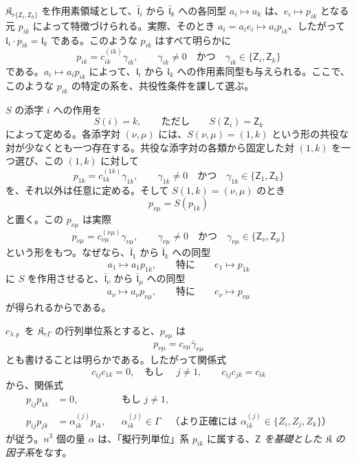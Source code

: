\(\mathfrak K_{r\{\mathsf{Z}_i,\mathsf{Z}_k\}}\) を作用素領域として、\(\bar{\mathfrak l}_i\) から \(\bar{\mathfrak l}_k\) への各同型 \(a_i\mapsto a_k\) は、\(e_i\mapsto p_{ik}\) となる元 \(p_{ik}\) によって特徴づけられる。実際、そのとき \(a_i=a_ie_i\mapsto a_ip_{ik}\)、したがって \(\mathfrak l_i\cdot p_{ik}=\mathfrak l_k\) である。このような \(p_{ik}\) はすべて明らかに
\[
p_{ik}=c_{ik}^{(ik)}\gamma_{ik},\qquad
\gamma_{ik}\ne0\quad\text{かつ}\quad \gamma_{ik}\in\{\mathsf{Z}_i,\mathsf{Z}_k\}
\]
である。\(a_i\mapsto a_ip_{ik}\) によって、\(\mathfrak l_i\) から \(\mathfrak l_k\) への作用素同型も与えられる。ここで、このような \(p_{ik}\) の特定の系を、共役性条件を課して選ぶ。

\(S\) の添字 \(i\) への作用を
\[
S(i)=k,\qquad\text{ただし}\qquad S(\mathsf{Z}_i)=\mathsf{Z}_k
\]
によって定める。各添字対 \((\nu,\mu)\) には、\(S(\nu,\mu)=(1,k)\) という形の共役な対が少なくとも一つ存在する。共役な添字対の各類から固定した対 \((1,k)\) を一つ選び、この \((1,k)\) に対して
\[
p_{1k}=c_{1k}^{(1k)}\gamma_{1k},\qquad
\gamma_{1k}\ne0\quad\text{かつ}\quad \gamma_{1k}\in\{\mathsf{Z}_1,\mathsf{Z}_k\}
\]
を、それ以外は任意に定める。そして \(S(1,k)=(\nu,\mu)\) のとき
\[
p_{\nu\mu}=S(p_{1k})
\]
と置く。この \(p_{\nu\mu}\) は実際
\[
p_{\nu\mu}=c_{\nu\mu}^{(\nu\mu)}\gamma_{\nu\mu},\qquad
\gamma_{\nu\mu}\ne0\quad\text{かつ}\quad \gamma_{\nu\mu}\in\{\mathsf{Z}_\nu,\mathsf{Z}_\mu\}
\]
という形をもつ。なぜなら、\(\bar{\mathfrak l}_1\) から \(\bar{\mathfrak l}_k\) への同型
\[
a_1\mapsto a_1p_{1k},\qquad
\text{特に}\qquad e_1\mapsto p_{1k}
\]
に \(S\) を作用させると、\(\bar{\mathfrak l}_\nu\) から \(\bar{\mathfrak l}_\mu\) への同型
\[
a_\nu\mapsto a_\nu p_{\nu\mu},\qquad
\text{特に}\qquad e_\nu\mapsto p_{\nu\mu}
\]
が得られるからである。

\(c_{\lambda\varrho}\) を \(\mathfrak K_{r\Gamma}\) の行列単位系とすると、\(p_{\nu\mu}\) は
\[
p_{\nu\mu}=c_{\nu\mu}\bar\gamma_{\nu\mu}
\]
とも書けることは明らかである。したがって関係式
\[
c_{ij}c_{1k}=0,\quad\text{もし }\quad j\ne1,
\qquad
c_{ij}c_{jk}=c_{ik}
\]
から、関係式
\[
\begin{aligned}
p_{ij}p_{1k}&=0,\quad &&\text{もし }j\ne1,\\
p_{ij}p_{jk}&=\alpha_{ik}^{(j)}p_{ik},
&&\alpha_{ik}^{(j)}\in\Gamma
\quad\text{（より正確には }\alpha_{ik}^{(j)}\in\{Z_i,Z_j,Z_k\}\text{）}
\end{aligned}
\]
が従う。\(n^3\) 個の量 \(\alpha\) は、「擬行列単位」系 \(p_{ik}\) に属する、\emph{\(\mathsf{Z}\) を基礎とした \(\mathfrak K\) の因子系}をなす。

